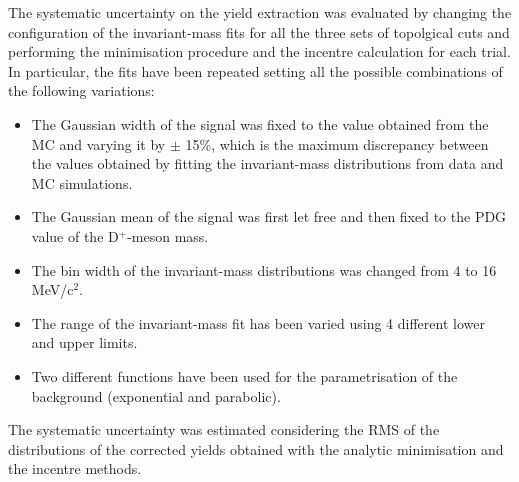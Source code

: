 \documentclass[b5paper,10pt,twoside,oldstyle,classica]{toptesi}
\begin{document}
\label{cutvar_syst_massfits_sec}
The systematic uncertainty on the yield extraction was evaluated by changing the configuration of the invariant-mass fits for all the three sets of topolgical cuts and performing the minimisation procedure and the incentre calculation for each trial. In particular, the fits have been repeated setting all the possible combinations of the following variations:
\begin{itemize}
 \item The Gaussian width of the signal was fixed to the value obtained from the MC and varying it by $\pm$ 15\%, which is the maximum discrepancy between the values obtained by fitting the invariant-mass distributions from data and MC simulations.  
 \item The Gaussian mean of the signal was first let free and then fixed to the PDG value of the D$^+$-meson mass.
 \item The bin width of the invariant-mass distributions was changed from 4 to 16 MeV/c$^2$.
 \item The range of the invariant-mass fit has been varied using 4 different lower and upper limits.
 \item Two different functions have been used for the parametrisation of the background (exponential and parabolic).
\end{itemize}
The systematic uncertainty was estimated considering the RMS of the distributions of the corrected yields obtained with the analytic minimisation and the incentre methods. 
\end{document}
